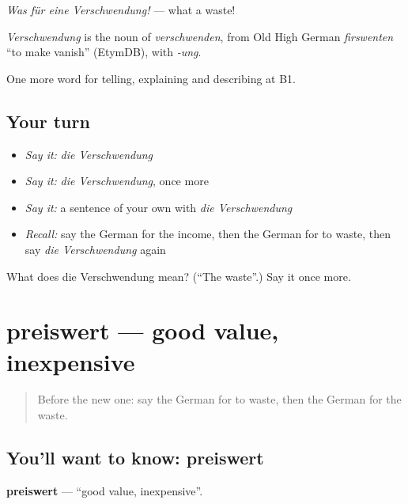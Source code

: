 \emph{Was für eine Verschwendung!} — what a waste!

\begin{cousinweb}
\emph{Verschwendung} is the noun of \emph{verschwenden}, from Old High German \emph{firswenten} \textquotedblleft{}to make vanish\textquotedblright{} (EtymDB), with \emph{-ung}.
\end{cousinweb}

\begin{grammarlens}[title={What you've built}]
One more word for telling, explaining and describing at B1.
\end{grammarlens}

\subsection*{Your turn}
\begin{itemize}
\raggedright
  \item \emph{Say it:} \emph{die Verschwendung}
  \item \emph{Say it:} \emph{die Verschwendung}, once more
  \item \emph{Say it:} a sentence of your own with \emph{die Verschwendung}
  \item \emph{Recall:} say the German for the income, then the German for to waste, then say \emph{die Verschwendung} again
\end{itemize}

\begin{tcolorbox}[breakable,colback=teal!4,colframe=teal!35!black,title={Before you move on}]
What does die Verschwendung mean? (\textquotedblleft{}The waste\textquotedblright{}.) Say it once more.
\end{tcolorbox}
\section[preiswert]{preiswert — good value, inexpensive}

\label{lesson:GE-C390-preiswert}



\begin{quote}
Before the new one: say the German for to waste, then the German for the waste.
\end{quote}

\subsection*{You'll want to know: preiswert}
\textbf{preiswert} — \textquotedblleft{}good value, inexpensive\textquotedblright{}.

